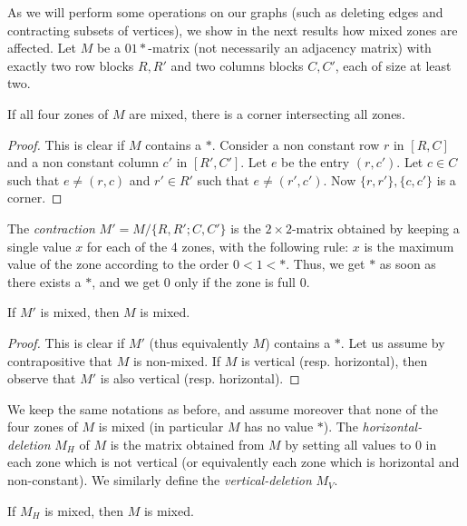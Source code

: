 \documentclass[11pt]{article}
\numberwithin{equation}{section}
\begin{document}
As we will perform some operations on our graphs (such as deleting edges and contracting subsets of vertices), we show in the next results how mixed zones are affected. Let $M$ be a $01*$-matrix (not necessarily an adjacency matrix) with exactly two row blocks $R,R'$ and two columns blocks $C,C'$, each of size at least two. 

\begin{lemma}\label{lem:4corner}
If all four zones of $M$ are mixed, there is a corner intersecting all zones.
\end{lemma}

\begin{proof}
This is clear if $M$ contains a $*$. Consider a non constant row $r$ in $[R,C]$ and a non constant column $c'$ in $[R',C']$. Let $e$ be the entry $(r,c')$. Let $c\in C$ such that $e\neq (r,c)$ and $r'\in R'$ such that $e\neq (r',c')$. Now $\{r,r'\},\{c,c'\}$ is a corner.
\end{proof}

The \emph{contraction} $M'=M/\{R,R';C,C'\}$ is the $2\times 2$-matrix obtained by keeping a single value $x$ for each of the 4 zones, with the following rule: $x$ is the maximum value of the zone according to the order $0<1<*$. Thus, we get $*$ as soon as there exists a $*$, and we get $0$ only if the zone is full $0$.

\begin{lemma}\label{lem:contract}
If $M'$ is mixed, then $M$ is mixed.
\end{lemma}

\begin{proof}
This is clear if $M'$ (thus equivalently $M$) contains a $*$. Let us assume by contrapositive that $M$ is non-mixed. If $M$ is vertical (resp. horizontal), then observe that $M'$ is also vertical (resp. horizontal).
\end{proof}
 
 We keep the same notations as before, and assume moreover that none of the four zones of $M$ is mixed (in particular $M$ has no value $*$). The \emph{horizontal-deletion} $M_H$ of $M$ is the matrix obtained from $M$ by setting all values to 0 in each zone which is not vertical (or equivalently each zone which is horizontal and non-constant). We similarly define the \emph{vertical-deletion} $M_V$.
 
\begin{lemma} \label{lem:deletion}
If $M_H$ is mixed, then $M$ is mixed.
\end{lemma}
\end{document}
